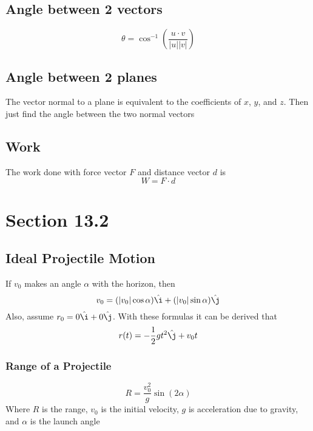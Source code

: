 \documentclass[12pt]{article}
\theoremstyle{break}
\numberwithin{theorem}{subsection}
\numberwithin{lemma}{subsection}
\numberwithin{corollary}{subsection}
\numberwithin{equation}{subsection}
\newcommand{\ihat}{\hat \i}
\newcommand{\jhat}{\hat \j}
\begin{document}
\subsection{Angle between 2 vectors}
\begin{equation*}
	\theta = \cos^{-1} \left( \frac{u \cdot v}{|u||v|} \right)
\end{equation*}

\subsection{Angle between 2 planes}
The vector normal to a plane is equivalent to the coefficients of $x$, $y$, and $z$.
Then just find the angle between the two normal vectors

\subsection{Work}
The work done with force vector $F$ and distance vector $d$ is 
\begin{equation*}
	W = F \cdot d
\end{equation*}

\section{Section 13.2}

\subsection{Ideal Projectile Motion}
If $v_0$ makes an angle $\alpha$ with the horizon, then 
\begin{equation*}
v_0 = (|v_0|\cos \alpha){\ihat} + (|v_0|\sin \alpha){\jhat}
\end{equation*}
Also, assume $r_0 = 0{\ihat} + 0{\hat \j}$. With these formulas it can be derived that
\begin{equation*}
r(t) = -\frac12 gt^2 {\hat \j} + v_0t
\end{equation*}

\subsubsection{Range of a Projectile}
\begin{equation*}
R = \frac{v_0^2}{g} \sin (2\alpha)
\end{equation*}
Where $R$ is the range, $v_0$ is the initial velocity, $g$ is acceleration due to gravity, and 
$\alpha$ is the launch angle
\end{document}
